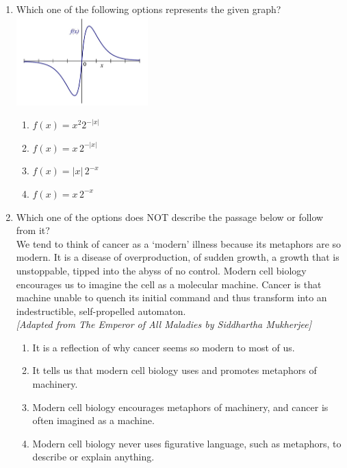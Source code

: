 \documentclass[journal,12pt,onecolumn]{IEEEtran}
\theoremstyle{remark}
\begin{document}
\begin{enumerate}
\newpage

\item Which one of the following options represents the given graph? \\[0.5em]
\includegraphics[width=0.4\textwidth]{figs/img 2.jpeg} %

\begin{enumerate}
\item $f(x) = x^2 2^{-|x|}$
\item $f(x) = x \, 2^{-|x|}$
\item $f(x) = |x| \, 2^{-x}$
\item $f(x) = x \, 2^{-x}$
\end{enumerate}
\hfill{}
\item Which one of the options does NOT describe the passage below or follow from it? \\[0.5em]
We tend to think of cancer as a `modern' illness because its metaphors are so modern. It is a disease of overproduction, of sudden growth, a growth that is unstoppable, tipped into the abyss of no control. Modern cell biology encourages us to imagine the cell as a molecular machine. Cancer is that machine unable to quench its initial command  and thus transform into an indestructible, self-propelled automaton. \\[0.5em]
\textit{[Adapted from The Emperor of All Maladies by Siddhartha Mukherjee]} \\[0.5em]

\begin{enumerate}
\item It is a reflection of why cancer seems so modern to most of us.
\item It tells us that modern cell biology uses and promotes metaphors of machinery.
\item Modern cell biology encourages metaphors of machinery, and cancer is often imagined as a machine.
\item Modern cell biology never uses figurative language, such as metaphors, to describe or explain anything.
\end{enumerate}
\hfill{}


\end{enumerate}
\end{document}
